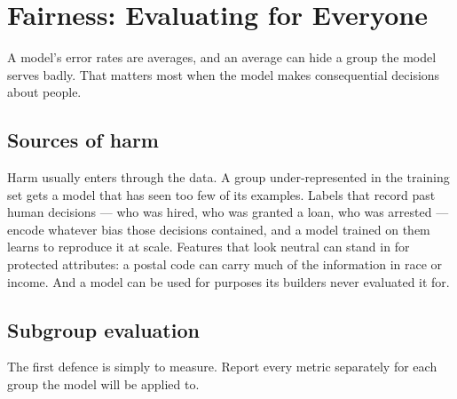 \section{Fairness: Evaluating for Everyone}
\label{sec:fairness}

A model's error rates are averages, and an average can hide a group the model
serves badly. That matters most when the model makes consequential decisions
about people.

\subsection{Sources of harm}

Harm usually enters through the data. A group under-represented in the training
set gets a model that has seen too few of its examples. Labels that record past
human decisions --- who was hired, who was granted a loan, who was arrested ---
encode whatever bias those decisions contained, and a model trained on them
learns to reproduce it at scale. Features that look neutral can stand in for
protected attributes: a postal code can carry much of the information in race or
income. And a model can be used for purposes its builders never evaluated it for.

\subsection{Subgroup evaluation}

The first defence is simply to measure. Report every metric separately for each
group the model will be applied to.

